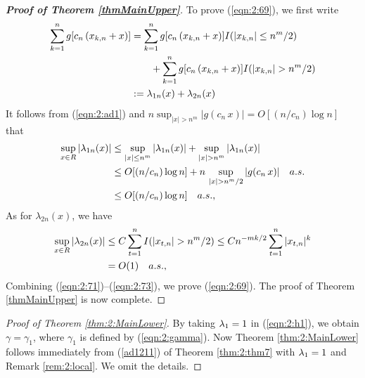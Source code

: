 \begin{proof}[\bf Proof of Theorem \ref {thmMainUpper}]
To prove (\ref {eqn:2:69}), we first write
\begin{align}
\sum_{k=1}^{n}g[c_{n}\,(x_{k,n}+x)] &= \sum_{k=1}^{n}g[c_{n}\,(x_{k,n}+x)] I(|x_{k,n}| \le n^{m}/2)  \no\\
&\qquad + \sum_{k=1}^{n}g[c_{n}\,(x_{k,n}+x)] I(|x_{k,n}| > n^{m}/2) \no\\
&:= \lambda_{1n}(x) + \lambda_{2n}(x) \la {eqn:2:71}
\end{align}
It follows from (\ref {eqn:2:ad1}) and $n \sup_{|x| > n^{m}}|g(c_n \, x)| = O[(n/c_n) \log n]$ that
\begin{align}
\sup_{x\in R} |\lambda_{1n}(x) |&\le \sup_{|x| \le n^{m}} |\lambda_{1n}(x)| + \sup_{|x| > n^{m}} | \lambda_{1n}(x) | \no\\
&\le O[(n/c_n)\log n] + n \, \sup_{|x| > n^{m}/2} | g(c_n \, x)| \quad a.s.  \no\\
&\le O[(n/c_n)\log n] \quad a.s., \la {eqn:2:72}
\end{align}
As for $\lambda_{2n}(x)$, we have
\begin{align}
\sup_{x\in R} |\lambda_{2n}(x)| &\le C \sum_{t = 1}^n  I(| x_{t,n}| > n^{m}/2)  \le C n^{-m k/2} \sum_{t = 1}^n  |x_{t,n}|^{k} \no\\
& = O(1) \quad a.s., \la {eqn:2:73}
\end{align}
Combining (\ref {eqn:2:71})--(\ref {eqn:2:73}), we prove (\ref {eqn:2:69}).
The proof of Theorem \ref {thmMainUpper} is now complete.
\end{proof}

\begin{proof}[Proof of Theorem \ref {thm:2:MainLower}] By taking $\lambda_1=1$ in (\ref {eqn:2:h1}), we obtain $\gamma=\gamma_1$, where $\gamma_1$ is defined by (\ref {eqn:2:gamma}). Now Theorem \ref {thm:2:MainLower} follows immediately from (\ref{ad1211}) of Theorem \ref {thm:2:thm7} with $\lambda_1=1$ and Remark \ref{rem:2:local}. We omit the details. 
\end{proof}

